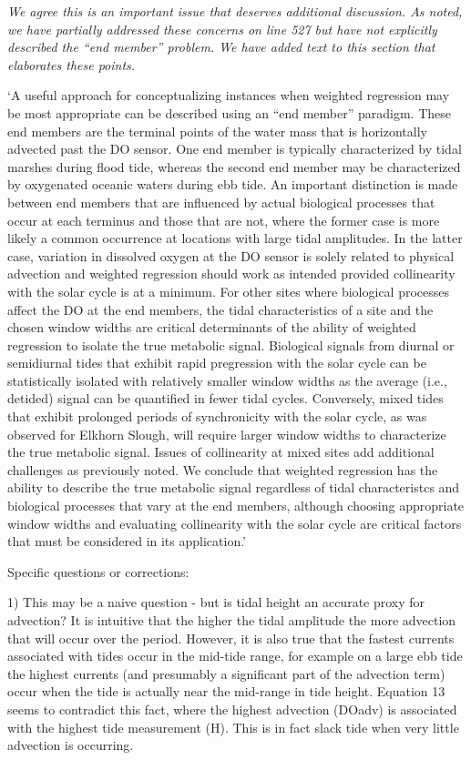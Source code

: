 \documentclass[letterpaper,12pt]{article}\usepackage[]{graphicx}\usepackage[]{color}
\begin{document}
{\it We agree this is an important issue that deserves additional discussion.  As noted, we have partially addressed these concerns on line 527 but have not explicitly described the ``end member'' problem.  We have added text to this section that elaborates these points. 

`A useful approach for conceptualizing instances when weighted regression may be most appropriate can be described using an ``end member'' paradigm.  These end members are the terminal points of the water mass that is horizontally advected past the DO sensor.  One end member is typically characterized by tidal marshes during flood tide, whereas the second end member may be characterized by oxygenated oceanic waters during ebb tide.  An important distinction is made between end members that are influenced by actual biological processes that occur at each terminus and those that are not, where the former case is more likely a common occurrence at locations with large tidal amplitudes.  In the latter case, variation in dissolved oxygen at the DO sensor is solely related to physical advection and weighted regression should work as intended provided collinearity with the solar cycle is at a minimum.  For other sites where biological processes affect the DO at the end members, the tidal characteristics of a site and the chosen window widths are critical determinants of the ability of weighted regression to isolate the true metabolic signal.  Biological signals from diurnal or semidiurnal tides that exhibit rapid pregression with the solar cycle can be statistically isolated with relatively smaller window widths as the average (i.e., detided) signal can be quantified in fewer tidal cycles.  Conversely, mixed tides that exhibit prolonged periods of synchronicity with the solar cycle, as was observed for Elkhorn Slough, will require larger window widths to characterize the true metabolic signal.  Issues of collinearity at mixed sites add additional challenges as previously noted.  We conclude that weighted regression has the ability to describe the true metabolic signal regardless of tidal characteristcs and biological processes that vary at the end members, although choosing appropriate window widths and evaluating collinearity with the solar cycle are critical factors that must be considered in its application.'
}

Specific questions or corrections:

1) This may be a naive question -  but is tidal height an accurate proxy for advection? It is intuitive that the higher the tidal amplitude the more advection that will occur over the period. However, it is also true that the fastest currents associated with tides occur in the mid-tide range, for example on a large ebb tide the highest currents (and presumably a significant part of the advection term) occur when the tide is actually near the mid-range in tide height. Equation 13 seems to contradict this fact, where the highest advection (DOadv) is associated with the highest tide measurement (H). This is in fact slack tide when very little advection is occurring.
\end{document}
